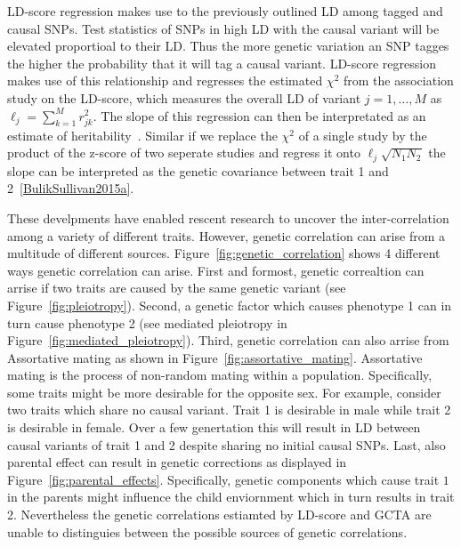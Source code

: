 LD-score regression makes use to the previously outlined LD among tagged and causal SNPs.
Test statistics of SNPs in high LD with the causal variant will be elevated proportioal to their LD\@.
Thus the more genetic variation an SNP tagges the higher the probability that it will tag a causal variant.
LD-score regression makes use of this relationship and regresses the estimated $\chi^2$ from the association study on the LD-score, which measures the overall LD of variant $j = 1, \ldots, M$ as $\ell_j = \sum^M_{k=1} r^2_{jk}$. 
The slope of this regression can then be interpretated as an estimate of heritability~\cite{Bulik-Sullivan2015}.
Similar if we replace the $\chi^2$ of a single study by the product of the z-score of two seperate studies and regress it onto $\ell_j \sqrt{N_{1}N_{2}}$ the slope can be interpreted as the genetic covariance between trait 1 and 2~\ref{BulikSullivan2015a}.

These develpments have enabled rescent research to uncover the inter-correlation among a variety of different traits.
However, genetic correlation can arise from a multitude of different sources.
Figure~\ref{fig:genetic_correlation} shows 4 different ways genetic correlation can arise.
First and formost, genetic correaltion can arrise if two traits are caused by the same genetic variant (see Figure~\ref{fig:pleiotropy}).
Second, a genetic factor which causes phenotype 1 can in turn cause phenotype 2 (see mediated pleiotropy in Figure~\ref{fig:mediated_pleiotropy}).
Third, genetic correlation can also arrise from Assortative mating as shown in Figure~\ref{fig:assortative_mating}.
Assortative mating is the process of non-random mating within a population.
Specifically, some traits might be more desirable for the opposite sex.
For example, consider two traits which share no causal variant.
Trait 1 is desirable in male while trait 2 is desirable in female.
Over a few genertation this will result in LD between causal variants of trait 1 and 2 despite sharing no initial causal SNPs. 
Last, also parental effect can result in genetic corrections as displayed in Figure~\ref{fig:parental_effects}.
Specifically, genetic components which cause trait $1$ in the parents might influence the child enviornment which in turn results in trait 2. 
Nevertheless the genetic correlations estiamted by LD-score and GCTA are unable to distinguies between the possible sources of genetic correlations.

